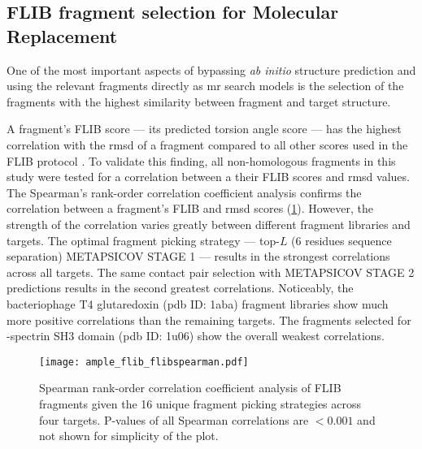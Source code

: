 \subsection{FLIB fragment selection for Molecular Replacement}
One of the most important aspects of bypassing \textit{ab initio} structure prediction and using the relevant fragments directly as \gls{mr} search models is the selection of the fragments with the highest similarity between fragment and target structure.

A fragment's FLIB score --- its predicted torsion angle score --- has the highest correlation with the \gls{rmsd} of a fragment compared to all other scores used in the FLIB protocol \cite{De_Oliveira2015-ba}. To validate this finding, all non-homologous fragments in this study were tested for a correlation between a their FLIB scores and \gls{rmsd} values. The Spearman's rank-order correlation coefficient analysis confirms the correlation between a fragment's FLIB and \gls{rmsd} scores (\cref{fig:ample_flib_flibspearman}). However, the strength of the correlation varies greatly between different fragment libraries and targets. The optimal fragment picking strategy --- top-$L$ (6 residues sequence separation) METAPSICOV STAGE 1 --- results in the strongest correlations across all targets. The same contact pair selection with METAPSICOV STAGE 2 predictions results in the second greatest correlations. Noticeably, the bacteriophage T4 glutaredoxin (\gls{pdb} ID: 1aba) fragment libraries show much more positive correlations than the remaining targets. The fragments selected for \textalpha-spectrin SH3 domain (\gls{pdb} ID: 1u06) show the overall weakest correlations.

\begin{figure}[H]
	\centering
	\texttt{[image: ample\_flib\_flibspearman.pdf]}
	\caption[Spearman rank-order correlation coefficient analysis of FLIB fragments]{Spearman rank-order correlation coefficient analysis of FLIB fragments given the 16 unique fragment picking strategies across four targets. P-values of all Spearman correlations are $<0.001$ and not shown for simplicity of the plot.}
	\label{fig:ample_flib_flibspearman}
\end{figure}

